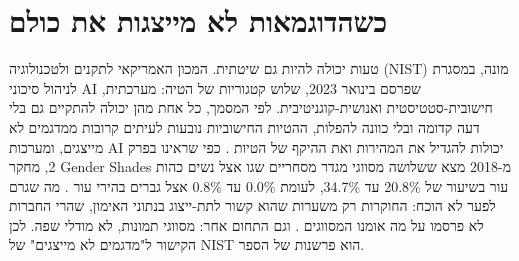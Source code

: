 \section{כשהדוגמאות לא מייצגות את כולם}
טעות יכולה להיות גם שיטתית. המכון האמריקאי לתקנים ולטכנולוגיה (NIST) מונה, במסגרת לניהול סיכוני AI שפרסם בינואר 2023, שלוש קטגוריות של הטיה: מערכתית, חישובית-סטטיסטית ואנושית-קוגניטיבית. לפי המסמך, כל אחת מהן יכולה להתקיים גם בלי דעה קדומה ובלי כוונה להפלות, ההטיות החישוביות נובעות לעיתים קרובות ממדגמים לא מייצגים, ומערכות AI יכולות להגדיל את המהירות ואת ההיקף של הטיות \cite{S-ch06-10}.
כפי שראינו בפרק 2, מחקר Gender Shades מ-2018 מצא ששלושה מסווגי מגדר מסחריים שגו אצל נשים כהות עור בשיעור של 20.8\% עד 34.7\%, לעומת 0.0\% עד 0.8\% אצל גברים בהירי עור \cite{S-ch02-01}. מה שגרם לפער לא הוכח: החוקרות רק משערות שהוא קשור לתת-ייצוג בנתוני האימון, שהרי החברות לא פרסמו על מה אומנו המסווגים \cite{S-ch02-01}. וגם התחום אחר: מסווגי תמונות, לא מודלי שפה. לכן הקישור ל"מדגמים לא מייצגים" של NIST הוא פרשנות של הספר.
